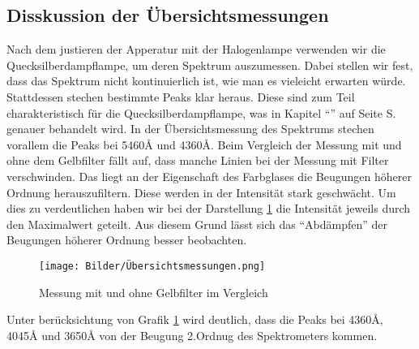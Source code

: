 \subsection{Disskussion der Übersichtsmessungen}

Nach dem justieren der Apperatur mit der Halogenlampe verwenden wir die Quecksilberdampflampe, um deren Spektrum auszumessen.
Dabei stellen wir fest, dass das Spektrum nicht kontinuierlich ist, wie man es vieleicht erwarten würde.
Stattdessen stechen bestimmte Peaks klar heraus. Diese sind zum Teil charakteristisch für die Quecksilberdampflampe, was in 
Kapitel "`"' auf Seite S.\pageref{Messlit} genauer behandelt wird.\newline
In der Übersichtsmessung des Spektrums stechen vorallem die Peaks bei 5460\r{A} und 4360\r{A}.
Beim Vergleich der Messung mit und ohne dem Gelbfilter fällt auf, dass manche Linien bei der Messung mit Filter verschwinden. Das liegt an der Eigenschaft des 
Farbglases die Beugungen höherer Ordnung herauszufiltern. Diese werden in der Intensität stark geschwächt. Um dies zu verdeutlichen haben wir bei der Darstellung \ref{Übersichtsmessungen}  die Intensität
jeweils durch den Maximalwert geteilt. Aus diesem Grund lässt sich das "`Abdämpfen"' der Beugungen höherer Ordnung besser  beobachten.

\begin{figure}[h]
    \centering
    \texttt{[image: Bilder/Übersichtsmessungen.png]}
    \caption{Messung mit und ohne Gelbfilter im Vergleich}
    \label{Übersichtsmessungen}
\end{figure}

Unter berücksichtung von Grafik \ref{Übersichtsmessungen} wird deutlich, dass die Peaks bei 4360\r{A}, 4045\r{A} und 3650\r{A} von der Beugung 2.Ordnug des Spektrometers kommen.

